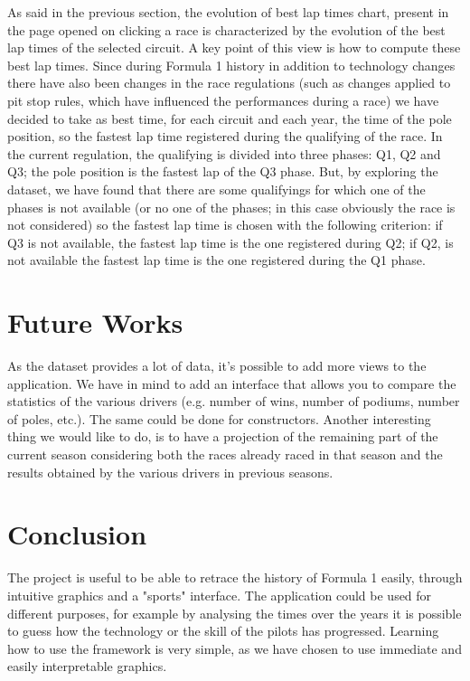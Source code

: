 \documentclass[11pt,twocolumn,letterpaper]{article}
\begin{document}
As said in the previous section, the evolution of best lap times chart, present in the page opened on clicking a race is characterized by the evolution of the best lap times of the selected circuit. A key point of this view is how to compute these best lap times. Since during Formula 1 history in addition to technology changes there have also been changes in the race regulations (such as changes applied to pit stop rules, which have influenced the performances during a race) we have decided to take as best time, for each circuit and each year, the time of the pole position, so the fastest lap time registered during the qualifying of the race. In the current regulation, the qualifying is divided into three phases: Q1, Q2 and Q3; the pole position is the fastest lap of the Q3 phase. But, by exploring the dataset, we have found that there are some qualifyings for which one of the phases is not available (or no one of the phases; in this case obviously the race is not considered) so the fastest lap time is chosen with the following criterion: if Q3 is not available, the fastest lap time is the one registered during Q2; if Q2, is not available the fastest lap time is the one registered during the Q1 phase.

\section{Future Works}
As the dataset provides a lot of data, it's possible to add more views to the application. We have in mind to add an interface that allows you to compare the statistics of the various drivers (e.g. number of wins, number of podiums, number of poles, etc.). The same could be done for constructors. Another interesting thing we would like to do, is to have a projection of the remaining part of the current season considering both the races already raced in that season and the results obtained by the various drivers in previous seasons.

\section{Conclusion}
The project is useful to be able to retrace the history of Formula 1 easily, through intuitive graphics and a "sports" interface. The application could be used for different purposes, for example by analysing the times over the years it is possible to guess how the technology or the skill of the pilots has progressed. Learning how to use the framework is very simple, as we have chosen to use immediate and easily interpretable graphics. 
\end{document}
